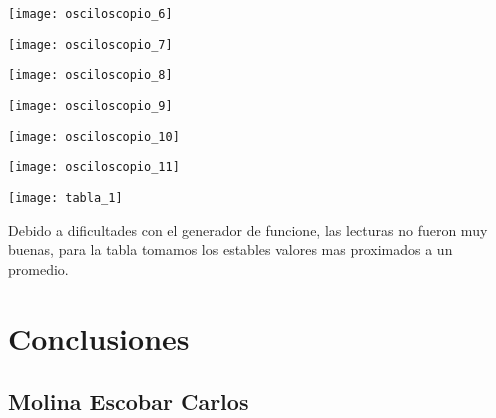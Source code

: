 \documentclass[11pt]{article}
\newenvironment{Figuras}
  {\par\medskip\noindent\minipage{\linewidth}}
  {\endminipage\par\medskip}
\begin{document}
\begin{multicols}{2}
			\begin{Figuras}
				\centering
			    \texttt{[image: osciloscopio\_6]}
			    \label{fig:mesh6}
			\end{Figuras}

			\begin{Figuras}
				\centering
			    \texttt{[image: osciloscopio\_7]}
			    \label{fig:mesh7}
			\end{Figuras}

			\begin{Figuras}
				\centering
			    \texttt{[image: osciloscopio\_8]}
			    \label{fig:mesh8}
			\end{Figuras}

			\begin{Figuras}
				\centering
			    \texttt{[image: osciloscopio\_9]}
			    \label{fig:mesh9}
			\end{Figuras}

			\begin{Figuras}
				\centering
			    \texttt{[image: osciloscopio\_10]}
			    \label{fig:mesh10}
			\end{Figuras}

			\begin{Figuras}
				\centering
			    \texttt{[image: osciloscopio\_11]}
			    \label{fig:mesh11}
			\end{Figuras}															

			\begin{Figuras}	
				\centering
			    \texttt{[image: tabla\_1]}
			\end{Figuras}

			Debido a dificultades con el generador de funcione, las lecturas no fueron muy buenas, para la tabla tomamos los estables valores mas proximados a un promedio.


\section{Conclusiones} 


		\subsection{Molina Escobar Carlos}


\end{multicols}
\end{document}

